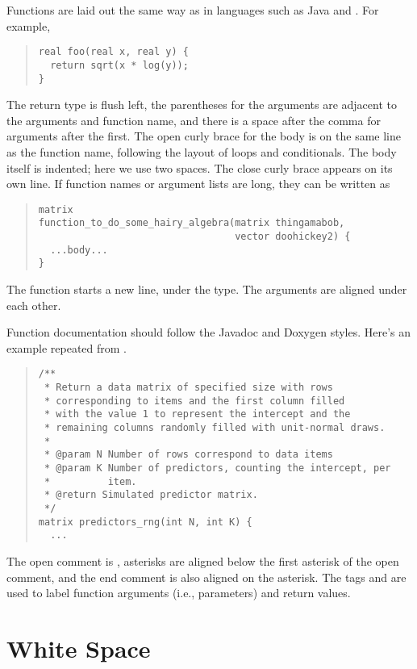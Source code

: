 Functions are laid out the same way as in languages such as Java and
\Cpp.  For example,
%
\begin{quote}
\begin{Verbatim}
real foo(real x, real y) {
  return sqrt(x * log(y));
}
\end{Verbatim}
\end{quote}
%
The return type is flush left, the parentheses for the arguments are
adjacent to the arguments and function name, and there is a space
after the comma for arguments after the first.  The open curly brace
for the body is on the same line as the function name, following the
layout of loops and conditionals.  The body itself is indented; here
we use two spaces.  The close curly brace appears on its own line.
%
If function names or argument lists are long, they can be
written as
%
\begin{quote}
\begin{Verbatim}
matrix
function_to_do_some_hairy_algebra(matrix thingamabob,
                                  vector doohickey2) {
  ...body...
}
\end{Verbatim}
\end{quote}
%
The function starts a new line, under the type.  The arguments are
aligned under each other.

Function documentation should follow the Javadoc and Doxygen styles.
Here's an example repeated from .
%
\begin{quote}
\begin{Verbatim}
/**
 * Return a data matrix of specified size with rows 
 * corresponding to items and the first column filled 
 * with the value 1 to represent the intercept and the 
 * remaining columns randomly filled with unit-normal draws.
 *
 * @param N Number of rows correspond to data items
 * @param K Number of predictors, counting the intercept, per
 *          item.
 * @return Simulated predictor matrix.
 */
matrix predictors_rng(int N, int K) {  
  ...
\end{Verbatim}
\end{quote}
%
The open comment is \code{/**}, asterisks are aligned below the first
asterisk of the open comment, and the end comment \code{*/} is also
aligned on the asterisk.  The tags  and 
are used to label function arguments (i.e., parameters) and return
values.  

\section{White Space}

